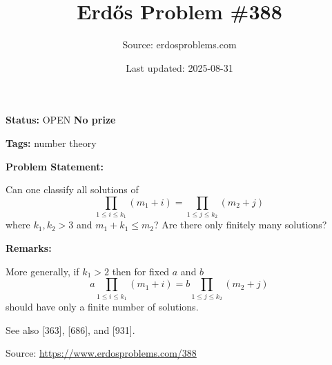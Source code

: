 \documentclass{article}
\title{Erd\H{o}s Problem \#388}
\date{Last updated: 2025-08-31}
\author{Source: erdosproblems.com}
\begin{document}
\maketitle

\noindent\textbf{Status:} OPEN \quad \textbf{No prize}

\noindent\textbf{Tags:} number theory

\medskip
\noindent\textbf{Problem Statement:}

Can one classify all solutions of\[\prod_{1\leq i\leq k_1}(m_1+i)=\prod_{1\leq j\leq k_2}(m_2+j)\]where $k_1,k_2>3$ and $m_1+k_1\leq m_2$? Are there only finitely many solutions?

\bigskip
\noindent\textbf{Remarks:}

More generally, if $k_1>2$ then for fixed $a$ and $b$\[a\prod_{1\leq i\leq k_1}(m_1+i)=b\prod_{1\leq j\leq k_2}(m_2+j)\]should have only a finite number of solutions. 

See also [363], [686], and [931].

\bigskip
\noindent\small{Source: \url{https://www.erdosproblems.com/388}}
\end{document}
